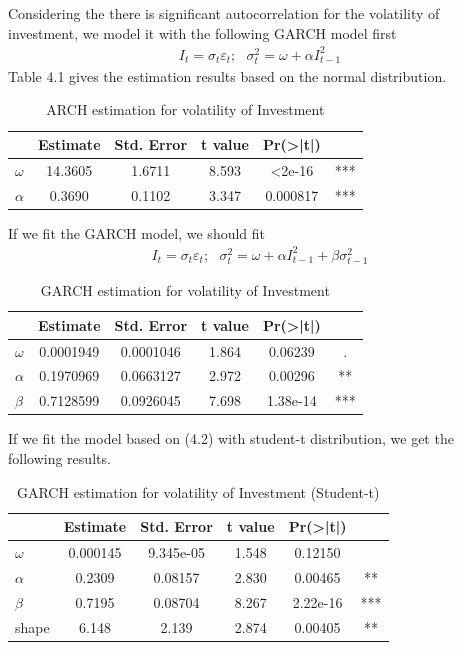\documentclass[12pt]{article}
\theoremstyle{definition}
\numberwithin{equation}{section}
\numberwithin{figure}{section}
\numberwithin{table}{section}
\begin{document}
Considering the there is significant autocorrelation for the volatility of investment, we model it with the following GARCH model first
\begin{align}
  I_t = \sigma_t \varepsilon_t; \ \ \ \sigma_t^2 = \omega + \alpha I_{t-1}^2
\end{align}
Table 4.1 gives the estimation results based on the normal distribution.
\begin{table}[H]
  \centering
  \renewcommand{\arraystretch}{1.2}
  \caption{ARCH estimation for volatility of Investment}
\begin{tabular}{lccccc}
  \hline
         & Estimate & Std. Error & t value & Pr(\textgreater{}|t|)  \\
         \hline
 $\omega$    &14.3605      &1.6711   & 8.593 & \textless 2e-16 & ***   \\
$\alpha$    & 0.3690   &    0.1102    & 3.347 & 0.000817 & ***  \\
 \hline
\end{tabular}
\end{table}

If we fit the GARCH model, we should fit
\begin{align}
  I_t = \sigma_t \varepsilon_t; \ \ \ \sigma_t^2 = \omega + \alpha I_{t-1}^2 + \beta \sigma_{t-1}^2
\end{align}
\begin{table}[H]
  \centering
  \renewcommand{\arraystretch}{1.2}
  \caption{GARCH estimation for volatility of Investment}
\begin{tabular}{lccccc}
  \hline
         & Estimate &  Std. Error & t value & Pr(\textgreater{}|t|) \\
         \hline
$\omega$& 0.0001949 &  0.0001046  &  1.864 & 0.06239 &. \\
 $\alpha$ & 0.1970969 &  0.0663127  &  2.972 & 0.00296& ** \\
 $\beta$ & 0.7128599 &  0.0926045 &   7.698 &1.38e-14& *** \\
 \hline
\end{tabular}
\end{table}

If we fit the model based on (4.2) with student-t distribution, we get the following results.
\begin{table}[H]
  \centering
  \renewcommand{\arraystretch}{1.2}
  \caption{GARCH estimation for volatility of Investment (Student-t)}
\begin{tabular}{lccccc}
  \hline
         & Estimate &  Std. Error & t value & Pr(\textgreater{}|t|) \\
         \hline
 $\omega$& 0.000145  & 9.345e-05  &  1.548 & 0.12150 \\
$\alpha$&0.2309  & 0.08157&  2.830 & 0.00465 &** \\
$\beta$& 0.7195 & 0.08704  &  8.267 &2.22e-16 &*** \\
shape &  6.148 &  2.139 &    2.874 & 0.00405 & ** \\
\hline
\end{tabular}
\end{table}
\end{document}
